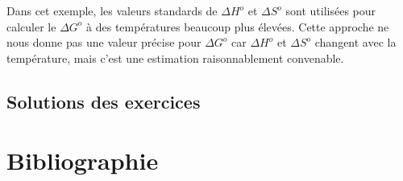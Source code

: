 \documentclass[
  11pt,
  a4paper,
  openany]{book}
\begin{document}
\begin{Answer}
Dans cet exemple, les valeurs standards de \(\Delta H^o\) et \(\Delta S^o\) sont utilisées pour calculer le \(\Delta G^o\) à des températures beaucoup plus élevées. Cette approche ne nous donne pas une valeur précise pour \(\Delta G^o\) car \(\Delta H^o\) et \(\Delta S^o\) changent avec la température, mais c'est une estimation raisonnablement convenable.

\end{Answer}

\section{Solutions des exercices} \shipoutAnswer

\hypertarget{bibliographie}{%
\chapter*{Bibliographie}\label{bibliographie}}
\end{document}
